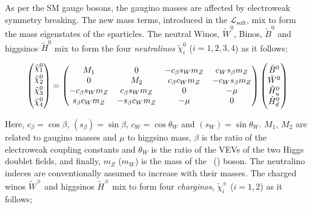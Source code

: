 
				As per the SM gauge bosons, the gaugino masses are affected by electroweak symmetry breaking. The new mass terms, introduced in the $\mathcal L_{\mathrm{soft}}$, mix to form the mass eigenstates of the sparticles. The neutral Winos, $\tilde{W}^0$, Binos, $\tilde{B}^0$ and higgsinos $\tilde{H}^0$ mix to form the four \textit{neutralinos} $\tilde{\chi}^0_i$ ($i=1,2,3,4$)  as it follows; 

				\begin{equation}
				\label{eq:neutralino_mixing}
					\begin{pmatrix}  \ninoone \\ \ninotwo \\ \ninothree \\ \ninofour \end{pmatrix}	
					= 
					\begin{pmatrix}
						M_1 & 0 & - c_\beta s_W m_Z &  c_W s_\beta m_Z  \\
						0 & M_2 & c_\beta c_W m_Z  &  - c_W s_\beta m_Z \\
						- c_\beta s_W m_Z  & c_\beta s_W m_Z  & 0 & - \mu \\ 
						s_\beta c_W m_Z  & - s_\beta c_W m_Z & - \mu & 0  
					\end{pmatrix}
					\begin{pmatrix}
						\tilde{B}^{0} \\
						\tilde{W}^{0} \\
						\tilde{H}^{0}_u \\
						\tilde{H}^{0}_d
					\end{pmatrix}
				\end{equation}

				\noindent Here, $c_{\beta} = \cos \beta$,  $(s_{\beta}) = \sin \beta$, $c_W = \cos \theta_W$ and $(s_W) = \sin \theta_W$. $M_1$, $M_2$ are related to gaugino masses and $\mu$ to higgsino mass, $\beta$ is the ratio of the electroweak coupling constants and $\theta_W$ is the ratio of the VEVs of the two Higgs doublet fields, and finally, $m_Z$ ($m_W$) is the mass of the \Zboson\ (\Wboson) boson. The neutralino indeces are conventionally assumed to increase with their masses. The charged winos $\tilde{W}^{\pm}$ and higgsinos $\tilde{H}^{\pm}$ mix to form four \textit{charginos}, $\tilde{\chi}^{\pm}_i$ ($i=1,2$) as it follows;

